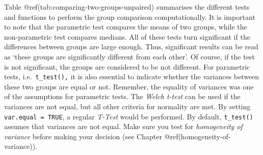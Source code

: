 \documentclass[
  letterpaper,
]{krantz}
\begin{document}
Table @ref(tab:comparing-two-groups-unpaired) summarises the different
tests and functions to perform the group comparison computationally. It
is important to note that the parametric test compares the means of two
groups, while the non-parametric test compares medians. All of these
tests turn significant if the differences between groups are large
enough. Thus, significant results can be read as `these groups are
significantly different from each other'. Of course, if the test is not
significant, the groups are considered to be not different. For
parametric tests, i.e.~\texttt{t\_test(),} it is also essential to
indicate whether the variances between these two groups are equal or
not. Remember, the equality of variances was one of the assumptions for
parametric tests. The \emph{Welch t-test} can be used if the variances
are not equal, but all other criteria for normality are met. By setting
\texttt{var.equal\ =\ TRUE}, a regular \emph{T-Test} would be performed.
By default, \texttt{t\_test()} assumes that variances are not equal.
Make sure you test for \emph{homogeneity of variance} before making your
decision (see Chapter @ref(homogeneity-of-variance)).
\end{document}
